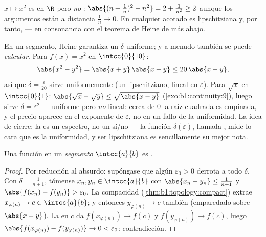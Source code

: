 \begin{example}\label{ex:b1:continuity:notuniform}
$x \mapsto x^2$ es  en $\R$ pero \emph{no}
:
$\abs{(n + \frac 1n)^2 - n^2} = 2 + \frac{1}{n^2} \geq 2$ aunque los
argumentos están a distancia $\frac 1n \to 0$. En cualquier 
acotado es lipschitziana y, por tanto,  ---
en consonancia con el teorema de Heine de más abajo.
\end{example}

\begin{example}\label{ex:b1:continuity:moduli}
En un segmento, Heine garantiza un $\delta$ uniforme; y a menudo
también se puede \emph{calcular}. Para $f(x) = x^2$ en $\intcc{0}{10}$:
\[
\abs{x^2 - y^2} = \abs{x + y}\,\abs{x - y} \leq 20\,\abs{x - y},
\]
así que $\delta = \frac{\varepsilon}{20}$ sirve uniformemente (un
 lipschitziano, lineal en $\varepsilon$). Para $\sqrt x$ en
$\intcc{0}{1}$: $\abs{\sqrt x - \sqrt y} \leq \sqrt{\abs{x - y}}$
(\cref{exo:b1:continuity:9}), luego sirve $\delta = \varepsilon^2$ ---
uniforme pero \emph{no} lineal: cerca de $0$ la raíz cuadrada es
empinada, y el precio aparece en el exponente de $\varepsilon$, no en
un fallo de la uniformidad. La idea de cierre: la
 es un espectro, no un sí/no --- la función
$\delta(\varepsilon)$, llamada , mide lo cara que es la
uniformidad, y ser lipschitziana es sencillamente su mejor nota.
\end{example}

\begin{theorem}[Heine]\label{thm:b1:continuity:heine}
Una función  en un \emph{segmento} $\intcc{a}{b}$ es
.
\end{theorem}

\begin{proof}
Por reducción al absurdo: supóngase que algún $\varepsilon_0 > 0$
derrota a todo $\delta$. Con $\delta = \frac{1}{n+1}$, tómense
$x_n, y_n \in \intcc{a}{b}$ con $\abs{x_n - y_n} \leq \frac{1}{n+1}$
y $\abs{f(x_n) - f(y_n)} > \varepsilon_0$. La compacidad
(\cref{thm:b1:topology:compact}) extrae
$x_{\varphi(n)} \to c \in \intcc{a}{b}$; y entonces
$y_{\varphi(n)} \to c$ también (emparedado sobre $\abs{x - y}$). La
 en $c$ da $f(x_{\varphi(n)}) \to f(c)$ y
$f(y_{\varphi(n)}) \to f(c)$, luego
$\abs{f(x_{\varphi(n)}) - f(y_{\varphi(n)})} \to 0 < \varepsilon_0$:
contradicción.
\end{proof}

